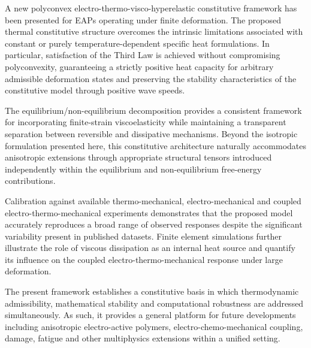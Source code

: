 
A new polyconvex electro-thermo-visco-hyperelastic constitutive framework has been presented for EAPs operating under finite deformation. The proposed thermal constitutive structure overcomes the intrinsic limitations associated with constant or purely temperature-dependent specific heat formulations. In particular, satisfaction of the Third Law is achieved without compromising polyconvexity, guaranteeing a strictly positive heat capacity for arbitrary admissible deformation states and preserving the stability characteristics of the constitutive model through positive wave speeds.

The equilibrium/non-equilibrium decomposition provides a consistent framework for incorporating finite-strain viscoelasticity while maintaining a transparent separation between reversible and dissipative mechanisms. Beyond the isotropic formulation presented here, this constitutive architecture naturally accommodates anisotropic extensions through appropriate structural tensors introduced independently within the equilibrium and non-equilibrium free-energy contributions.

Calibration against available thermo-mechanical, electro-mechanical and coupled electro-thermo-mechanical experiments demonstrates that the proposed model accurately reproduces a broad range of observed responses despite the significant variability present in published datasets. Finite element simulations further illustrate the role of viscous dissipation as an internal heat source and quantify its influence on the coupled electro-thermo-mechanical response under large deformation.

The present framework establishes a constitutive basis in which thermodynamic admissibility, mathematical stability and computational robustness are addressed simultaneously. As such, it provides a general platform for future developments including anisotropic electro-active polymers, electro-chemo-mechanical coupling, damage, fatigue and other multiphysics extensions within a unified setting.









